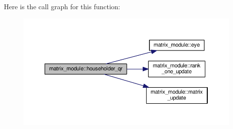 Here is the call graph for this function\-:\nopagebreak
\begin{figure}[H]
\begin{center}
\leavevmode
\includegraphics[width=350pt]{classmatrix__module_ac88cca09a0310ee3f4f32c86f6aac9e6_cgraph}
\end{center}
\end{figure}


